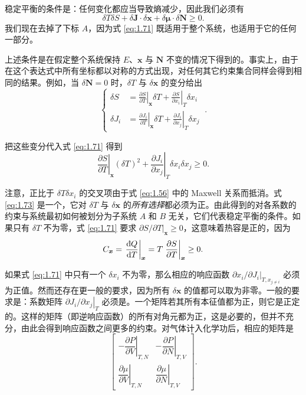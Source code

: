 稳定平衡的条件是：任何变化都应当导致熵减少，因此我们必须有
\begin{equation}
\delta T\delta S+\delta\bm{J}\cdot\delta\bm{x}+\delta\bm{\mu}\cdot\delta\bm{N}\ge0.
\label{eq:1.71}
\end{equation}
我们现在去掉了下标 $A$，因为式 \eqref{eq:1.71} 既适用于整个系统，也适用于它的任何一部分。

上述条件是在假定整个系统保持 $E$、$\bm{x}$ 与 $\bm{N}$ 不变的情况下得到的。事实上，由于在这个表达式中所有坐标都以对称的方式出现，对任何其它约束集合同样会得到相同的结果。例如，当 $\delta\bm{N}=0$ 时，$\delta T$ 与 $\delta\bm{x}$ 的变分给出
\begin{equation}
\left\{
\begin{aligned}
\delta S&=\left.\frac{\partial S}{\partial T}\right|_{\bm{x}}\delta T+\left.\frac{\partial S}{\partial x_i}\right|_T\delta x_i\\
\delta J_i&=\left.\frac{\partial J_i}{\partial T}\right|_{\bm{x}}\delta T+\left.\frac{\partial J_i}{\partial x_j}\right|_T\delta x_j
\end{aligned}
\right.\ .
\label{eq:1.72}
\end{equation}

把这些变分代入式 \eqref{eq:1.71} 得到
\begin{equation}
\left.\frac{\partial S}{\partial T}\right|_{\bm{x}}(\delta T)^2+\left.\frac{\partial J_i}{\partial x_j}\right|_T\delta x_i\delta x_j\ge0.
\label{eq:1.73}
\end{equation}

注意，正比于 $\delta T\delta x_i$ 的交叉项由于式 \eqref{eq:1.56} 中的 Maxwell 关系而抵消。式 \eqref{eq:1.73} 是一个，它对 $\delta T$ 与 $\delta\bm{x}$ 的\emph{所有选择}都必须为正。由此得到的对各系数的约束与系统最初如何被划分为子系统 $A$ 和 $B$ 无关，它们代表稳定平衡的条件。如果只有 $\delta T$ 不为零，式 \eqref{eq:1.71} 要求 $\left.\partial S/\partial T\right|_{\bm{x}}\ge0$，这意味着热容是正的，因为
\begin{equation}
C_{\bm{x}}=\left.\frac{\inexd Q}{\mathrm{d}T}\right|_{\bm{x}}=T\left.\frac{\partial S}{\partial T}\right|_{\bm{x}}\ge0.
\label{eq:1.74}
\end{equation}

如果式 \eqref{eq:1.71} 中只有一个 $\delta x_i$ 不为零，那么相应的响应函数 $\left.\partial x_i/\partial J_i\right|_{T,x_{j\neq i}}$ 必须为正值。然而还存在更一般的要求，因为所有 $\delta\bm{x}$ 的值都可以取为非零。一般的要求是：系数矩阵 $\left.\partial J_i/\partial x_j\right|_T$ 必须是。一个矩阵若其所有本征值都为正，则它是正定的。这样的矩阵（即逆响应函数）的所有对角元都为正，这是必要的，但并不充分，由此会得到响应函数之间更多的约束。对气体计入化学功后，相应的矩阵是
\begin{equation}
\begin{bmatrix}
-\left.\dfrac{\partial P}{\partial V}\right|_{T,N} & -\left.\dfrac{\partial P}{\partial N}\right|_{T,V}\\[1.2em]
\left.\dfrac{\partial\mu}{\partial V}\right|_{T,N} & \left.\dfrac{\partial\mu}{\partial N}\right|_{T,V}
\end{bmatrix}.
\label{eq:1.75}
\end{equation}

